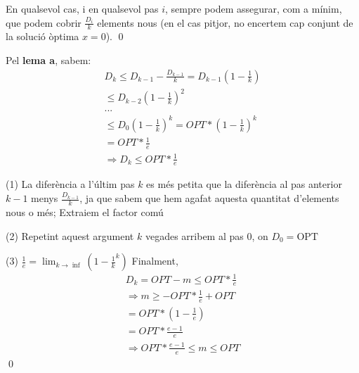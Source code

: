 \documentclass{article}
\begin{document}
En qualsevol cas, i en qualsevol pas $i$, sempre podem assegurar, com a mínim, que podem cobrir $\frac{D_i}{k}$ elements nous (en el cas pitjor, no encertem cap conjunt de la solució òptima $x=0$).
\qed

Pel \textbf{lema a}, sabem:
\begin{eqnarray}
    D_k \leq D_{k-1}-\frac{D_{k-1}}{k} = D_{k-1}(1-\frac{1}{k})\\
    \leq D_{k-2}(1-\frac{1}{k})^2 \nonumber\\
    ... \nonumber \\
    \leq D_{0}(1-\frac{1}{k})^k = OPT*(1-\frac{1}{k})^k \\
    = OPT* \frac{1}{e} \\
    \Rightarrow D_k \leq OPT* \frac{1}{e} \nonumber
\end{eqnarray}
\par
(1) La diferència a l'últim pas $k$ es més petita que la diferència al pas anterior $k-1$ menys $\frac{D_{k-1}}{k}$, ja que sabem que hem agafat aquesta quantitat d'elements nous o més; Extraiem el factor comú
\newline
\par
(2) Repetint aquest argument $k$ vegades arribem al pas 0, on $D_0 = \text{OPT}$
\newline
\par
(3) $\frac{1}{e}=\lim_{k \longrightarrow \inf}(1-\frac{1}{k}^k)$
\newline
\newline
Finalment,
\begin{eqnarray}
    D_k = OPT - m \leq OPT*\frac{1}{e} \nonumber\\ 
    \Rightarrow m \geq -OPT*\frac{1}{e}+OPT \nonumber\\
    = OPT*(1-\frac{1}{e}) \nonumber\\
    = OPT*\frac{e-1}{e}  \nonumber\\
    \Rightarrow OPT*\frac{e-1}{e} \leq m \leq OPT \nonumber
\end{eqnarray}
\renewcommand\qedsymbol{$\blacksquare$}
\qed
\end{document}
